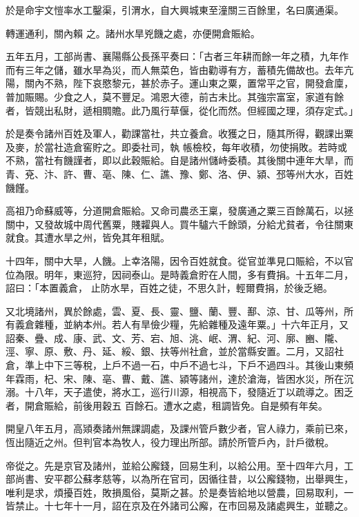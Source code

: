 \begin{pinyinscope}
 於是命宇文愷率水工鑿渠，引渭水，自大興城東至潼關三百餘里，名曰廣通渠。



 轉運通利，關內賴
 之。諸州水旱兇饑之處，亦便開倉賑給。



 五年五月，工部尚書、襄陽縣公長孫平奏曰：「古者三年耕而餘一年之積，九年作而有三年之儲，雖水旱為災，而人無菜色，皆由勸導有方，蓄積先備故也。去年亢陽，關內不熟，陛下哀愍黎元，甚於赤子。運山東之粟，置常平之官，開發倉廩，普加賑賜。少食之人，莫不豐足。鴻恩大德，前古未比。其強宗富室，家道有餘者，皆競出私財，遞相賙贍。此乃風行草偃，從化而然。但經國之理，須存定式。」



 於是奏令諸州百姓及軍人，勸課當社，共立養倉。收獲之日，隨其所得，觀課出粟及麥，於當社造倉窖貯之。即委社司，執
 帳檢校，每年收積，勿使捐敗。若時或不熟，當社有饑謹者，即以此穀賑給。自是諸州儲峙委積。其後關中連年大旱，而青、兗、汴、許、曹、亳、陳、仁、譙、豫、鄭、洛、伊、潁、邳等州大水，百姓饑饉。



 高祖乃命蘇威等，分道開倉賑給。又命司農丞王稟，發廣通之粟三百餘萬石，以拯關中，又發故城中周代舊粟，賤糶與人。買牛驢六千餘頭，分給尤貧者，令往關東就食。其遭水旱之州，皆免其年租賦。



 十四年，關中大旱，人饑。上幸洛陽，因令百姓就食。從官並準見口賑給，不以官位為限。明年，東巡狩，因祠泰山。是時義倉貯在人間，多有費捐。十五年二月，詔曰：「本置義倉，
 止防水旱，百姓之徒，不思久計，輕爾費捐，於後乏絕。



 又北境諸州，異於餘處，雲、夏、長、靈、鹽、蘭、豐、鄯、涼、甘、瓜等州，所有義倉雜種，並納本州。若人有旱儉少糧，先給雜種及遠年粟。」十六年正月，又詔秦、疊、成、康、武、文、芳、宕、旭、洮、岷、渭、紀、河、廓、豳、隴、涇、寧、原、敷、丹、延、綏、銀、扶等州社倉，並於當縣安置。二月，又詔社倉，準上中下三等稅，上戶不過一石，中戶不過七斗，下戶不過四斗。其後山東頻年霖雨，杞、宋、陳、亳、曹、戴、譙、潁等諸州，達於滄海，皆困水災，所在沉溺。十八年，天子遣使，將水工，巡行川源，相視高下，發隨近丁以疏導之。困乏者，開倉賑給，前後用穀五
 百餘石。遭水之處，租調皆免。自是頻有年矣。



 開皇八年五月，高熲奏諸州無課調處，及課州管戶數少者，官人祿力，乘前已來，恆出隨近之州。但判官本為牧人，役力理出所部。請於所管戶內，計戶徵稅。



 帝從之。先是京官及諸州，並給公廨錢，回易生利，以給公用。至十四年六月，工部尚書、安平郡公蘇孝慈等，以為所在官司，因循往昔，以公廨錢物，出舉興生，唯利是求，煩擾百姓，敗損風俗，莫斯之甚。於是奏皆給地以營農，回易取利，一皆禁止。十七年十一月，詔在京及在外諸司公廨，在市回易及諸處興生，並聽之。




\end{pinyinscope}
